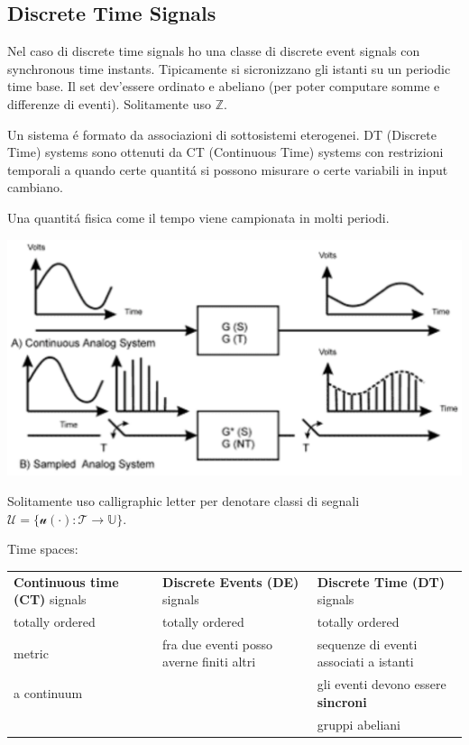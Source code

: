 \subsection{Discrete Time Signals}
Nel caso di discrete time signals ho una classe di discrete event signals con synchronous time instants. Tipicamente si sicronizzano 
gli istanti su un periodic time base. Il set dev'essere ordinato e abeliano (per poter computare somme e differenze di eventi).
Solitamente uso $\mathbb{Z}$.

Un sistema \'e formato da associazioni di sottosistemi eterogenei. 
DT (Discrete Time) systems sono ottenuti da CT (Continuous Time) systems con restrizioni temporali a quando certe quantit\'a si possono
misurare o certe variabili in input cambiano. 

Una quantit\'a fisica come il tempo viene campionata in molti periodi.
\begin{center}
\includegraphics[scale=0.35]{Chapters/Img/c01_01.png}\\
\end{center}

Solitamente uso calligraphic letter per denotare classi di segnali $\mathcal{U} = \{ \mathcal{u} (\cdot ) : \mathcal{T} \rightarrow \mathbb{U} \}$.
\begin{center}
    Time spaces:
    \begin{tabular}{lll}
        \textbf{Continuous time (CT)} signals & \textbf{Discrete Events (DE)} signals & \textbf{Discrete Time (DT)} signals\\
        totally ordered & totally ordered & totally ordered\\
        metric & fra due eventi posso averne finiti altri & sequenze di eventi associati a istanti \\ %
        a continuum & & gli eventi devono essere \textbf{sincroni}\\
        & & gruppi abeliani \\
    \end{tabular}
\end{center}

